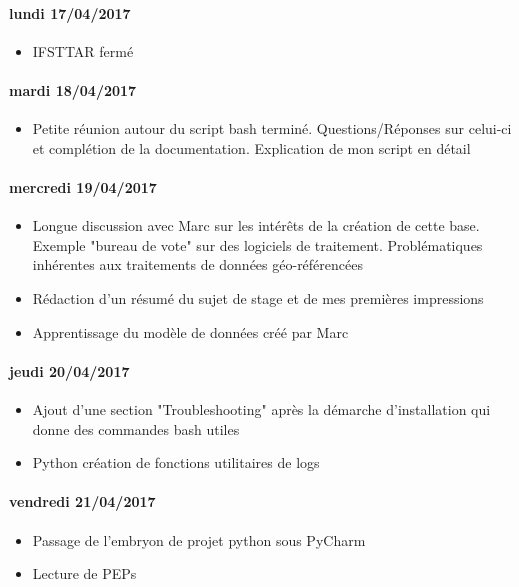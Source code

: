 \paragraph{lundi 17/04/2017}
\begin{itemize}
  \item IFSTTAR fermé
\end{itemize}

\paragraph{mardi 18/04/2017}
\begin{itemize}
  \item Petite réunion autour du script bash terminé. Questions/Réponses sur celui-ci et complétion de la documentation. Explication de mon script en détail
\end{itemize}

\paragraph{mercredi 19/04/2017}
\begin{itemize}
  \item Longue discussion avec Marc sur les intérêts de la création de cette base. Exemple "bureau de vote" sur des logiciels de traitement. Problématiques inhérentes aux traitements de données géo-référencées
  \item Rédaction d'un résumé du sujet de stage et de mes premières impressions
  \item Apprentissage du modèle de données créé par Marc
\end{itemize}

\paragraph{jeudi 20/04/2017}
\begin{itemize}
  \item Ajout d'une section "Troubleshooting" après la démarche d'installation qui donne des commandes bash utiles
  \item Python création de fonctions utilitaires de logs
\end{itemize}

\paragraph{vendredi 21/04/2017}
\begin{itemize}
  \item Passage de l'embryon de projet python sous PyCharm
  \item Lecture de PEPs
\end{itemize}

